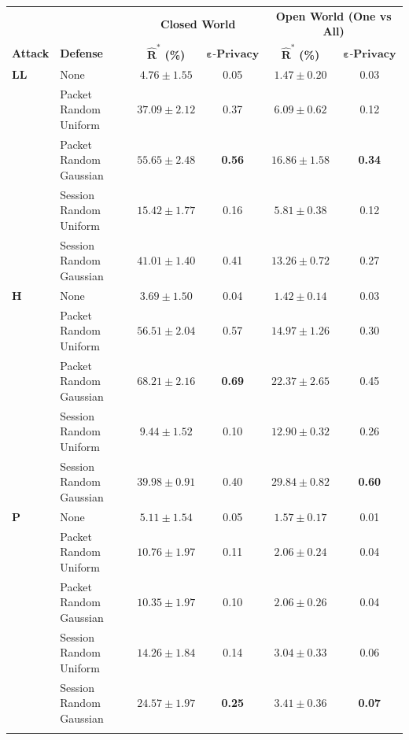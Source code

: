 \documentclass[
	ruledheaders=chapter,
	class=report,
	thesis={type=master, department=inf},
	accentcolor=1c,
	custommargins=true,
	marginpar=false,
	parskip=half-,
	fontsize=11pt,
]{tudapub}
\begin{document}
	\begin{table}
		\centering
		\small
		\begin{tabular}{llcccc}
			\toprule 
			& & \multicolumn{2}{c}{\textbf{Closed World}} & \multicolumn{2}{c}{\textbf{Open World (One vs All)}} \\
			\textbf{Attack} & \textbf{Defense} & $\mathbf{\widehat{R}^*}$ \textbf{(\%)} & $\mathbf{\varepsilon}\textbf{-Privacy}$ & $\mathbf{\widehat{R}^*}$ \textbf{(\%)} & $\mathbf{\varepsilon}\textbf{-Privacy}$ \\
			\midrule
			\textbf{LL} & None & $4.76 \pm 1.55$ & 0.05 & $1.47\pm 0.20$ & 0.03 \\
			 & Packet Random Uniform & $37.09 \pm 2.12$ & 0.37 & $6.09\pm 0.62$ & 0.12 \\
			 & Packet Random Gaussian & $\mathbf{55.65 \pm 2.48}$ & \textbf{0.56} & $\mathbf{16.86\pm 1.58}$ & \textbf{0.34} \\
			 & Session Random Uniform & $15.42 \pm 1.77$ & 0.16 & $5.81\pm 0.38$ & 0.12 \\
			 & Session Random Gaussian & $41.01 \pm 1.40$ & 0.41 & $13.26\pm 0.72$ & 0.27 \\ \addlinespace
			 
		    \textbf{H} & None & $3.69 \pm 1.50$ & 0.04 & $1.42\pm 0.14$ & 0.03 \\
			 & Packet Random Uniform & $56.51 \pm 2.04$ & 0.57 & $14.97\pm 1.26$ & 0.30 \\
			 & Packet Random Gaussian & $\mathbf{68.21 \pm 2.16}$ & \textbf{0.69} & $22.37\pm 2.65$ & 0.45 \\
			 & Session Random Uniform & $9.44 \pm 1.52$ & 0.10 & $12.90\pm 0.32$ & 0.26 \\
			 & Session Random Gaussian & $39.98 \pm 0.91$ & 0.40 & $\mathbf{29.84\pm 0.82}$ & \textbf{0.60} \\ \addlinespace
			 
			\textbf{P} & None & $5.11 \pm 1.54$ & 0.05 & $1.57 \pm 0.17$ & 0.01 \\
			 & Packet Random Uniform & $10.76 \pm 1.97$ & 0.11 & $2.06 \pm 0.24$ & 0.04 \\
			 & Packet Random Gaussian & $10.35 \pm 1.97$ & 0.10 & $2.06 \pm 0.26$ & 0.04 \\
			 & Session Random Uniform & $14.26 \pm 1.84$ & 0.14 & $3.04 \pm 0.33$ & 0.06 \\
			 & Session Random Gaussian & $\mathbf{24.57 \pm 1.97}$ & \textbf{0.25} & $\mathbf{3.41 \pm 0.36}$ & \textbf{0.07} \\ \addlinespace
			 

\end{tabular}
\end{table}
\end{document}
